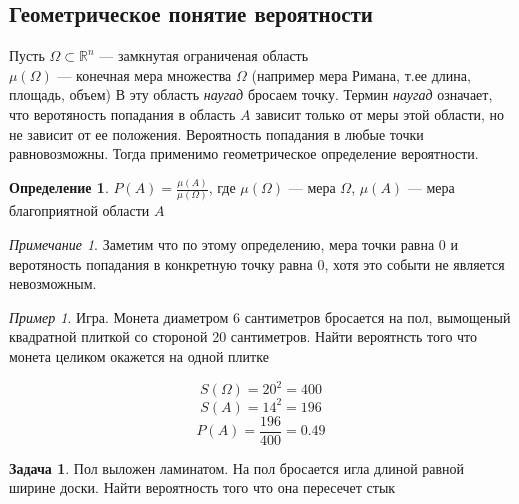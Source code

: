 \documentclass[oneside]{book}
\newcommand{\R}{\mathbb{R}}
\theoremstyle{plain}
\theoremstyle{remark}
\newtheorem*{remark}{Примечание}
\newtheorem*{examp}{Пример}
\theoremstyle{definition}
\newtheorem{task}{Задача}
\newtheorem*{definition}{Определение}
\begin{document}
\subsection{Геометрическое понятие вероятности}
\label{sec:org4ffafb6}
Пусть \(\Omega \subset \R^n\)  --- замкнутая ограниченая область \\
\(\mu(\Omega)\) --- конечная мера множества \(\Omega\) (например мера Римана, т.ее длина, площадь, объем) 
В эту область \emph{наугад} бросаем точку. Термин \emph{наугад} означает, что веротяность попадания в область \(A\)
зависит только от меры этой области, но не зависит от ее положения. Вероятность попадания в любые точки равновозможны.
Тогда применимо геометрическое определение вероятности.
\begin{definition}
\(P(A) = \frac{\mu(A)}{\mu(\Omega)}\), где \(\mu(\Omega)\) --- мера \(\Omega\), \(\mu(A)\) --- мера благоприятной области \(A\)
\end{definition}
\begin{remark}
Заметим что по этому определению, мера точки равна \(0\) и веротяность попадания в конкретную точку равна \(0\), хотя это событи не является невозможным.
\end{remark}
\begin{examp}
Игра. Монета диаметром 6 сантиметров бросается на пол, вымощеный
квадратной плиткой со стороной 20 сантиметров. Найти вероятнсть того
что монета целиком окажется на одной плитке
\begin{center}
\end{center}

\[ S(\Omega) = 20^2 = 400 \]
\[ S(A) = 14^2 = 196 \]
\[ P(A) = \frac{196}{400} = 0.49 \]
\end{examp}
\begin{task}
Пол выложен ламинатом. На пол бросается игла длиной равной ширине
доски. Найти вероятность того что она пересечет стык
\end{task}
\end{document}
